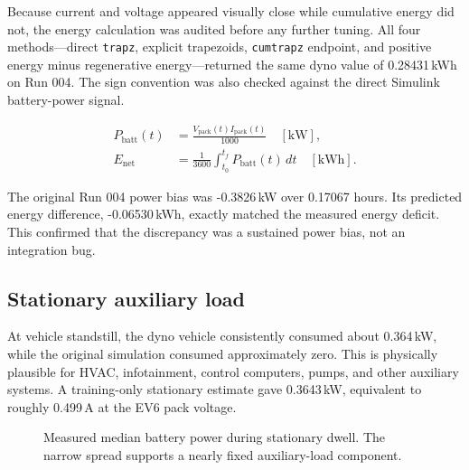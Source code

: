 \documentclass[11pt,letterpaper]{article}
\newcommand{\SI}[2]{#1\,#2}
\newcommand{\si}[1]{\mathrm{#1}}
\begin{document}
Because current and voltage appeared visually close while cumulative energy did
not, the energy calculation was audited before any further tuning. All four
methods---direct \texttt{trapz}, explicit trapezoids, \texttt{cumtrapz}
endpoint, and positive energy minus regenerative energy---returned the same
dyno value of \SI{0.28431}{kWh} on Run 004. The sign convention was also checked
against the direct Simulink battery-power signal.

\begin{align}
P_{\mathrm{batt}}(t) &= \frac{V_{\mathrm{pack}}(t) I_{\mathrm{pack}}(t)}{1000}
\quad [\si{kW}], \\
E_{\mathrm{net}} &= \frac{1}{3600}\int_{t_0}^{t_f}P_{\mathrm{batt}}(t)\,dt
\quad [\si{kWh}].
\end{align}

The original Run 004 power bias was \SI{-0.3826}{kW} over 0.17067 hours. Its
predicted energy difference, \SI{-0.06530}{kWh}, exactly matched the measured
energy deficit. This confirmed that the discrepancy was a sustained power bias,
not an integration bug.

\subsection{Stationary auxiliary load}

At vehicle standstill, the dyno vehicle consistently consumed about
\SI{0.364}{kW}, while the original simulation consumed approximately zero.
This is physically plausible for HVAC, infotainment, control computers, pumps,
and other auxiliary systems. A training-only stationary estimate gave
\SI{0.3643}{kW}, equivalent to roughly \SI{0.499}{A} at the EV6 pack voltage.

\begin{figure}[H]
\centering
{}
\caption{Measured median battery power during stationary dwell. The narrow spread supports a nearly fixed auxiliary-load component.}
\end{figure}
\end{document}
